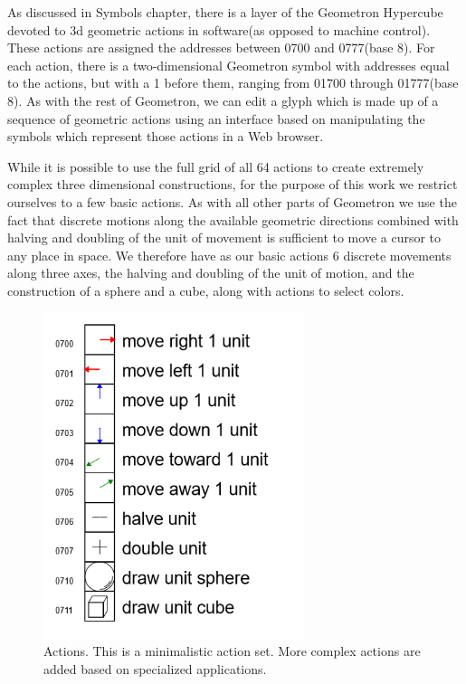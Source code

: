 

As discussed in Symbols chapter, there is a layer of the Geometron Hypercube devoted to 3d geometric actions in software(as opposed to machine control).  These actions are assigned the addresses between 0700 and 0777(base 8).  For each action, there is a two-dimensional Geometron symbol with addresses equal to the actions, but with a 1 before them, ranging from 01700 through 01777(base 8).  As with the rest of Geometron, we can edit a glyph which is made up of a sequence of geometric actions using an interface based on manipulating the symbols which represent those actions in a Web browser.

While it is possible to use the full grid of all 64 actions to create extremely complex three dimensional constructions, for the purpose of this work we restrict ourselves to a few basic actions.  As with all other parts of Geometron we use the fact that discrete motions along the available geometric directions combined with halving and doubling of the unit of movement is sufficient to move a cursor to any place in space.  We therefore have as our basic actions 6 discrete movements along three axes, the halving and doubling of the unit of motion, and the construction of a sphere and a cube, along with actions to select colors. 


\begin{figure}
	\centering
	\includegraphics[width=3in]{figures/geometron3d/actions.png}
	\caption[actions3d]
	{Actions.  This is a minimalistic action set. More complex actions are added based on specialized applications.}
\end{figure}

